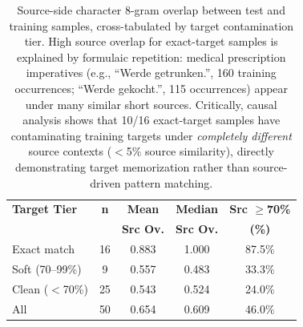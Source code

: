 \begin{table}[t]
\centering
\small
\begin{tabular}{lcccc}
\toprule
\textbf{Target Tier} & \textbf{n} & \textbf{Mean} & \textbf{Median} & \textbf{Src $\geq$70\%} \\
                     &   & \textbf{Src Ov.} & \textbf{Src Ov.} & \textbf{(\%)} \\
\midrule
Exact match          & 16 & 0.883 & 1.000 & 87.5\% \\
Soft (70--99\%)      &  9 & 0.557 & 0.483 & 33.3\% \\
Clean ($<$70\%)      & 25 & 0.543 & 0.524 & 24.0\% \\
\midrule
All                  & 50 & 0.654 & 0.609 & 46.0\% \\
\bottomrule
\end{tabular}
\caption{Source-side character 8-gram overlap between test and training samples,
cross-tabulated by target contamination tier.
High source overlap for exact-target samples is explained by formulaic repetition:
medical prescription imperatives (e.g., ``Werde getrunken.'', 160 training occurrences;
``Werde gekocht.'', 115 occurrences) appear under many similar short sources.
Critically, causal analysis shows that 10/16 exact-target samples have
contaminating training targets under \emph{completely different} source contexts
($<$5\% source similarity), directly demonstrating target memorization rather
than source-driven pattern matching.}
\label{tab:source-overlap}
\end{table}

